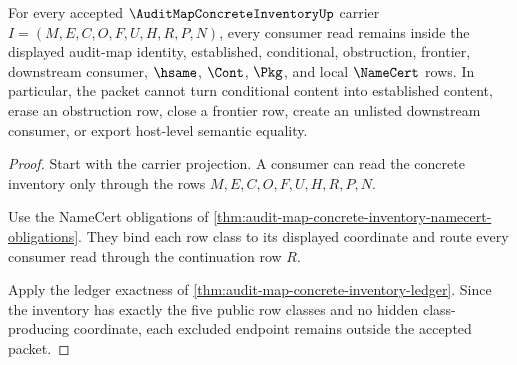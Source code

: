 \begin{theorem}
\label{thm:audit-map-concrete-inventory-nonescape}
For every accepted $\AuditMapConcreteInventoryUp$ carrier $I=(M,E,C,O,F,U,H,R,P,N)$, every consumer read remains inside the displayed audit-map identity, established, conditional, obstruction, frontier, downstream consumer, $\hsame$, $\Cont$, $\Pkg$, and local $\NameCert$ rows. In particular, the packet cannot turn conditional content into established content, erase an obstruction row, close a frontier row, create an unlisted downstream consumer, or export host-level semantic equality.
\end{theorem}
\begin{proof}
Start with the carrier projection. A consumer can read the concrete inventory only through the rows $M,E,C,O,F,U,H,R,P,N$.

Use the NameCert obligations of \autoref{thm:audit-map-concrete-inventory-namecert-obligations}. They bind each row class to its displayed coordinate and route every consumer read through the continuation row $R$.

Apply the ledger exactness of \autoref{thm:audit-map-concrete-inventory-ledger}. Since the inventory has exactly the five public row classes and no hidden class-producing coordinate, each excluded endpoint remains outside the accepted packet.
\end{proof}


\begin{closurestatus}{\AuditMapConcreteInventoryUp}
  \theoryclosure{\seedClosure}
  \formalstatus{\unformalizedV}
\end{closurestatus}
